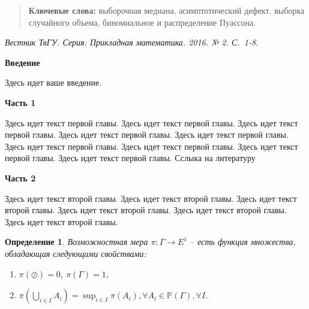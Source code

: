 \documentclass[a4paper,twoside]{article}
\newcommand{\firstheader}[1]{\noindent\textbf{#1}\nopagebreak\bigskip}
\newcommand{\header}[1]{\bigskip\medskip\noindent\textbf{#1}\nopagebreak\bigskip}
\theoremstyle{theorem}
\newtheorem{definition}{Определение}
\theoremstyle{remark}
\newcommand{\pages}{1-8}
\begin{document}
\begin{quote}
{\bf Ключевые слова:} выборочная медиана, асимптотический дефект, выборка случайного объема, биномиальное и распределение Пуассона.
\end{quote}
{\small {\it Вестник ТвГУ. Серия: Прикладная математика. 2016. № 2. С.~\pages.}}
\vspace{5mm}



\firstheader{Введение}

Здесь идет ваше введение.

\header{Часть 1}

Здесь идет текст первой главы. Здесь идет текст первой главы. Здесь идет текст первой главы. 
Здесь идет текст первой главы. Здесь идет текст первой главы. Здесь идет текст первой главы. 
Здесь идет текст первой главы. Здесь идет текст первой главы. Здесь идет текст первой главы. 
Сслыка на литературу \cite{Sychev}


\header{Часть 2}

Здесь идет текст второй главы. Здесь идет текст второй главы. Здесь идет текст второй главы.
Здесь идет текст второй главы. Здесь идет текст второй главы. Здесь идет текст второй главы.
\begin{definition}
Возможностная мера $\pi:\Gamma\rightarrow E^1$ -- есть функция множества, обладающая следующими свойствами:
\begin{enumerate}
\item $\pi(\oslash) = 0$, $\pi(\Gamma) = 1$,
\item $\displaystyle\pi\left(\bigcup_{i\in I}A_i\right) = \sup_{i\in I}\pi(A_i), \forall A_i\in {\mathbb P}(\Gamma), \forall I$.
\end{enumerate}
\end{definition}
\end{document}
